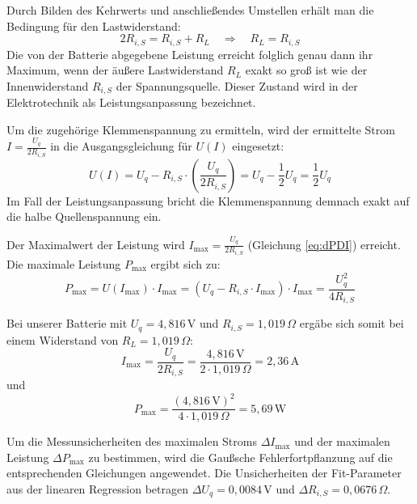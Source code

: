 \documentclass[12pt,a4paper,titlepage]{scrartcl}
\numberwithin{equation}{section}
\numberwithin{table}{section}
\numberwithin{figure}{section}
\begin{document}
Durch Bilden des Kehrwerts und anschließendes Umstellen erhält man die Bedingung für den Lastwiderstand:
\begin{equation}
    2 R_{i{,}S} = R_{i{,}S} + R_L \quad \Rightarrow \quad R_L = R_{i{,}S}
\end{equation}
Die von der Batterie abgegebene Leistung erreicht folglich genau dann ihr Maximum, wenn der äußere Lastwiderstand $R_L$ exakt so groß ist wie der Innenwiderstand $R_{i{,}S}$ der Spannungsquelle. Dieser Zustand wird in der Elektrotechnik als Leistungsanpassung bezeichnet.

Um die zugehörige Klemmenspannung zu ermitteln, wird der ermittelte Strom $I = \frac{U_q}{2 R_{i{,}S}}$ in die Ausgangsgleichung für $U(I)$ eingesetzt:
\begin{equation}
    U(I) = U_q - R_{i{,}S} \cdot \left( \frac{U_q}{2 R_{i{,}S}} \right) = U_q - \frac{1}{2} U_q = \frac{1}{2} U_q
\end{equation}
Im Fall der Leistungsanpassung bricht die Klemmenspannung demnach exakt auf die halbe Quellenspannung ein.

\medskip
Der Maximalwert der Leistung wird  $I_\text{max} = \frac{U_q}{2 R_{i{,}S}}$ (Gleichung \ref{eq:dPDI}) erreicht.
Die maximale Leistung $P_\text{max}$ ergibt sich zu:
\begin{equation}
    P_\text{max} = U(I_\text{max}) \cdot I_\text{max} = \left( U_q - R_{i{,}S} \cdot I_\text{max} \right) \cdot I_\text{max} = \frac{U_q^2}{4 R_{i{,}S}}
\end{equation} 

\medskip    
Bei unserer Batterie mit $U_q = 4{,}816\,\text{V}$ und $R_{i{,}S} = 1{,}019\,\Omega$ ergäbe sich somit bei einem Widerstand von $R_L = 1{,}019\,\Omega$:
\begin{equation}
    I_\text{max} = \frac{U_q}{2 R_{i{,}S}} = \frac{4{,}816\,\text{V}}{2 \cdot 1{,}019\,\Omega} = 2{,}36\,\text{A}
\end{equation}
und
\begin{equation}
    P_\text{max} = \frac{(4{,}816\,\text{V})^2}{4 \cdot 1{,}019\,\Omega} = 5{,}69\,\text{W}
\end{equation}

Um die Messunsicherheiten des maximalen Stroms $\Delta I_\text{max}$ und der maximalen Leistung $\Delta P_\text{max}$ zu bestimmen, wird die Gaußsche Fehlerfortpflanzung auf die entsprechenden Gleichungen angewendet. 
Die Unsicherheiten der Fit-Parameter aus der linearen Regression betragen $\Delta U_q = 0{,}0084\,\text{V}$ und $\Delta R_{i{,}S} = 0{,}0676\,\Omega$.
\end{document}
